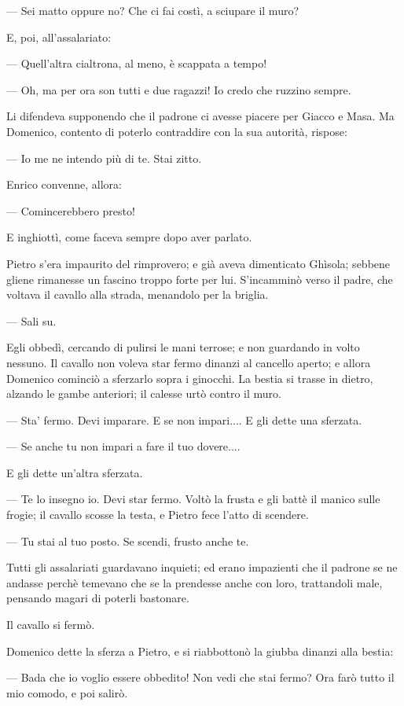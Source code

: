 — Sei matto oppure no? Che ci fai costì, a sciupare il muro?

E, poi, all’assalariato:

— Quell’altra cialtrona, al meno, è scappata a tempo!

— Oh, ma per ora son tutti e due ragazzi! Io credo che ruzzino sempre.

Li difendeva supponendo che il padrone ci avesse piacere per Giacco e Masa. Ma Domenico, contento di poterlo contraddire con la sua autorità, rispose:

— Io me ne intendo più di te. Stai zitto.

Enrico convenne, allora:

— Comincerebbero presto!

E inghiottì, come faceva sempre dopo aver parlato.

Pietro s’era impaurito del rimprovero; e già aveva dimenticato Ghìsola; sebbene gliene rimanesse un fascino troppo forte per lui. S’incamminò verso il padre, che voltava il cavallo alla strada, menandolo per la briglia.

— Sali su.

Egli obbedì, cercando di pulirsi le mani terrose; e non guardando in volto nessuno. Il cavallo non voleva star fermo dinanzi al cancello aperto; e allora Domenico cominciò a sferzarlo sopra i ginocchi. La bestia si trasse in dietro, alzando le gambe anteriori; il calesse urtò contro il muro.

— Sta’ fermo. Devi imparare. E se non impari.... E gli dette una sferzata.

— Se anche tu non impari a fare il tuo dovere....

E gli dette un'altra sferzata.

— Te lo insegno io. Devi star fermo. Voltò la frusta e gli battè il manico sulle frogie; il cavallo scosse la testa, e Pietro fece l'atto di scendere.

— Tu stai al tuo posto. Se scendi, frusto anche te.

Tutti gli assalariati guardavano inquieti; ed erano impazienti che il padrone se ne andasse perchè temevano che se la prendesse anche con loro, trattandoli male, pensando magari di poterli bastonare.

Il cavallo si fermò.

Domenico dette la sferza a Pietro, e si riabbottonò la giubba dinanzi alla bestia:

— Bada che io voglio essere obbedito! Non vedi che stai fermo? Ora farò tutto il mio comodo, e poi salirò.

